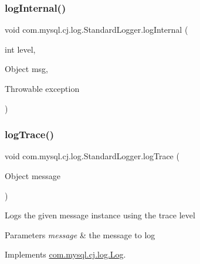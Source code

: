 \subsubsection{\texorpdfstring{log\+Internal()}{logInternal()}}
{\footnotesize\ttfamily void com.\+mysql.\+cj.\+log.\+Standard\+Logger.\+log\+Internal (\begin{DoxyParamCaption}\item[{int}]{level,  }\item[{Object}]{msg,  }\item[{Throwable}]{exception }\end{DoxyParamCaption})\hspace{0.3cm}{\ttfamily [protected]}}

\mbox{\label{classcom_1_1mysql_1_1cj_1_1log_1_1_standard_logger_a31c4a397719a30877e689fcba2e1054a}} 
\subsubsection{\texorpdfstring{log\+Trace()}{logTrace()}\hspace{0.1cm}{\footnotesize\ttfamily [1/2]}}
{\footnotesize\ttfamily void com.\+mysql.\+cj.\+log.\+Standard\+Logger.\+log\+Trace (\begin{DoxyParamCaption}\item[{Object}]{message }\end{DoxyParamCaption})}

Logs the given message instance using the \textquotesingle{}trace\textquotesingle{} level


\begin{DoxyParams}{Parameters}
{\em message} & the message to log \\
\hline
\end{DoxyParams}


Implements \mbox{\hyperlink{interfacecom_1_1mysql_1_1cj_1_1log_1_1_log_a04f51d4b9464df28c94695ae8159440e}{com.\+mysql.\+cj.\+log.\+Log}}.

\mbox{\label{classcom_1_1mysql_1_1cj_1_1log_1_1_standard_logger_ae77a38e81b2d0ecb1ccbeafee9294bd3}} 
